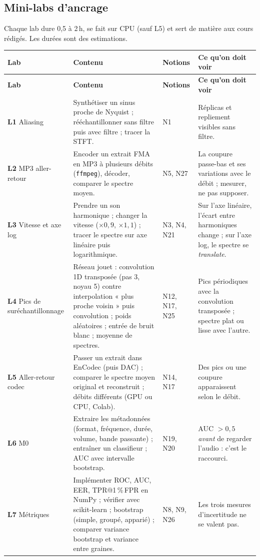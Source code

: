 \documentclass[11pt,a4paper]{article}
\makeatletter
\newcommand{\tprfpr}{TPR@1\,\%\,FPR}
\makeatother
\begin{document}
\subsection{Mini-labs d'ancrage}

Chaque lab dure 0,5 à 2\,h, se fait sur CPU (sauf L5) et sert de matière aux cours rédigés. Les durées sont des estimations.

{\small
\begin{longtable}{L{1.9cm}L{6.2cm}L{1.6cm}L{4.4cm}}
\toprule
\textbf{Lab} & \textbf{Contenu} & \textbf{Notions} & \textbf{Ce qu'on doit voir}\\
\midrule
\endfirsthead
\toprule
\textbf{Lab} & \textbf{Contenu} & \textbf{Notions} & \textbf{Ce qu'on doit voir}\\
\midrule
\endhead
\bottomrule
\endfoot
\textbf{L1} Aliasing & Synthétiser un sinus proche de Nyquist ; rééchantillonner sans filtre puis avec filtre ; tracer la STFT. & N1 & Réplicas et repliement visibles sans filtre.\\
\textbf{L2} MP3 aller-retour & Encoder un extrait FMA en MP3 à plusieurs débits (\texttt{ffmpeg}), décoder, comparer le spectre moyen. & N5, N27 & La coupure passe-bas et ses variations avec le débit ; mesurer, ne pas supposer.\\
\textbf{L3} Vitesse et axe log & Prendre un son harmonique ; changer la vitesse ($\times 0{,}9$, $\times 1{,}1$) ; tracer le spectre sur axe linéaire puis logarithmique. & N3, N4, N21 & Sur l'axe linéaire, l'écart entre harmoniques change ; sur l'axe log, le spectre se \emph{translate}.\\
\textbf{L4} Pics de suréchantillonnage & Réseau jouet : convolution 1D transposée (pas 3, noyau 5) contre interpolation « plus proche voisin » puis convolution ; poids aléatoires ; entrée de bruit blanc ; moyenne de spectres. & N12, N17, N25 & Pics périodiques avec la convolution transposée ; spectre plat ou lisse avec l'autre.\\
\textbf{L5} Aller-retour codec & Passer un extrait dans EnCodec (puis DAC) ; comparer le spectre moyen original et reconstruit ; débits différents (GPU ou CPU, Colab). & N14, N17 & Des pics ou une coupure apparaissent selon le débit.\\
\textbf{L6} M0 & Extraire les métadonnées (format, fréquence, durée, volume, bande passante) ; entraîner un classifieur ; AUC avec intervalle bootstrap. & N19, N20 & AUC $>0{,}5$ \emph{avant} de regarder l'audio : c'est le raccourci.\\
\textbf{L7} Métriques & Implémenter ROC, AUC, EER, \tprfpr{} en NumPy ; vérifier avec scikit-learn ; bootstrap (simple, groupé, apparié) ; comparer variance bootstrap et variance entre graines. & N8, N9, N26 & Les trois mesures d'incertitude ne se valent pas.\\

\end{longtable}}
\end{document}
